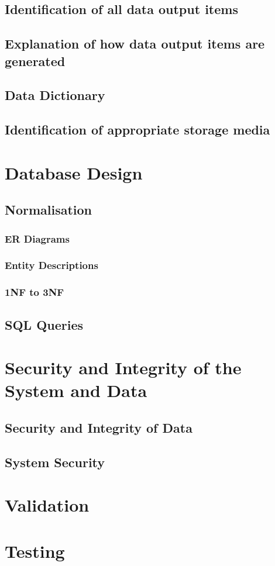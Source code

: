 \subsection{Identification of all data output items}

\subsection{Explanation of how data output items are generated}

\subsection{Data Dictionary}

\subsection{Identification of appropriate storage media}

\section{Database Design}

\subsection{Normalisation}

\subsubsection{ER Diagrams}

\subsubsection{Entity Descriptions}

\subsubsection{1NF to 3NF}

\subsection{SQL Queries}

\section{Security and Integrity of the System and Data}

\subsection{Security and Integrity of Data}

\subsection{System Security}

\section{Validation}

\section{Testing}

